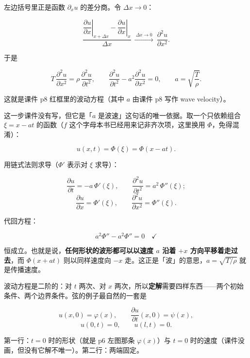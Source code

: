 左边括号里正是函数 $\partial_x u$ 的差分商。令 $\Delta x\to0$：

\[
\frac{\left.\dfrac{\partial u}{\partial x}\right|_{x+\Delta x}-\left.\dfrac{\partial u}{\partial x}\right|_{x}}{\Delta x}
\ \xrightarrow{\ \Delta x\to0\ }\
\frac{\partial^2u}{\partial x^2}.
\]


于是

\[
T\,\frac{\partial^2u}{\partial x^2}=\rho\,\frac{\partial^2u}{\partial t^2},
\qquad
\frac{\partial^2u}{\partial t^2}-a^2\frac{\partial^2u}{\partial x^2}=0,
\qquad
a=\sqrt{\frac{T}{\rho}} .
\]

这就是课件 p8 红框里的波动方程（其中 $a$ 由课件 p8 写作 wave velocity）。


这一步课件没有写，但它是「$a$ 是波速」这句话的唯一依据。取一个只依赖组合 $\xi=x-at$ 的函数（$f$ 这个字母本书已经用来记非齐次项，这里换用 $\Phi$，免得混淆）：

\[
u(x,t)=\Phi(\xi)=\Phi(x-at).
\]

用链式法则求导（$\Phi'$ 表示对 $\xi$ 求导）：

\[
\frac{\partial u}{\partial t}=-a\,\Phi'(\xi),\qquad
\frac{\partial^2u}{\partial t^2}=a^2\,\Phi''(\xi);
\]
\[
\frac{\partial u}{\partial x}=\Phi'(\xi),\qquad
\frac{\partial^2u}{\partial x^2}=\Phi''(\xi).
\]

代回方程：

\[
a^2\Phi''-a^2\Phi''=0\quad\checkmark
\]

恒成立。也就是说，\textbf{任何形状的波形都可以以速度 $a$ 沿着 $+x$ 方向平移着走过去}，而 $\Phi(x+at)$ 则以同样速度向 $-x$ 走。这正是「波」的意思，$a=\sqrt{T/\rho}$ 就是传播速度。


波动方程是二阶的：对 $t$ 两次、对 $x$ 两次，所以\textbf{定解}需要四样东西——两个初始条件、两个边界条件。弦的例子最自然的一套是

\[
u(x,0)=\varphi(x),\qquad \frac{\partial u}{\partial t}(x,0)=\psi(x),
\]
\[
u(0,t)=0,\qquad u(l,t)=0 .
\]

第一行：$t=0$ 时的形状（就是 p6 左图那条 $\varphi(x)$）与 $t=0$ 时的速度（课件没画，但没有它解不唯一）。第二行：两端固定。


